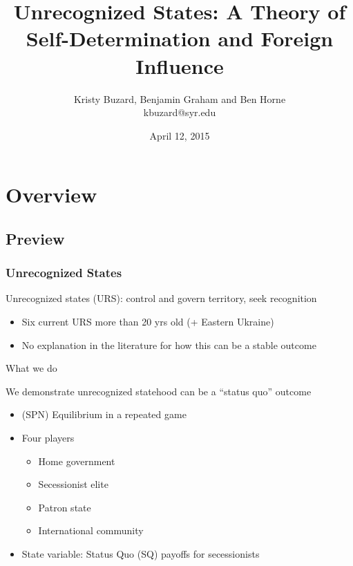 \documentclass{beamer}
\begin{document}
\title[Unrecognized States: A Theory of Self-Determination and Foreign Influence\hspace{1.25in}\insertframenumber/\inserttotalframenumber]{Unrecognized States: A Theory of Self-Determination and Foreign Influence}
\author[Kristy Buzard, Benjamin Graham and Ben Horne]{Kristy Buzard, Benjamin Graham and Ben Horne\\ kbuzard@syr.edu}
\date{April 12, 2015}
\maketitle



\section{Overview}
\subsection{Preview}
\begin{frame}
\frametitle{Unrecognized States}
Unrecognized states (URS): control and govern territory, seek recognition
\pause
\begin{itemize}[<+->]
  \item Six current URS more than 20 yrs old (+ Eastern Ukraine)
	\item No explanation in the literature for how this can be a stable outcome
\end{itemize}
\end{frame}


\begin{frame}{What we do}

\pause
We demonstrate unrecognized statehood can be a ``status quo'' outcome
\pause
\begin{itemize}[<+->]
	\item (SPN) Equilibrium in a repeated game
	\item Four players
		\begin{itemize}[<+->]
			\item Home government
			\item Secessionist elite
			\item Patron state
			\item International community
		\end{itemize}
	\item State variable: Status Quo (SQ) payoffs for secessionists
\end{itemize}

\end{frame}
\end{document}
